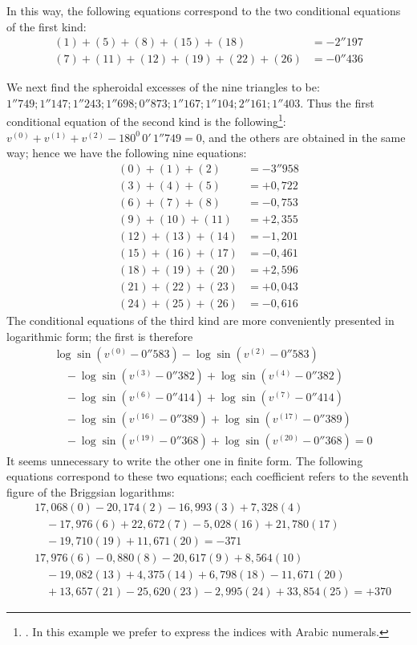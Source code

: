 In this way, the following equations correspond to the two conditional equations of the first kind:
\[
\begin{aligned}
(1)+(5)+(8)+(15)+(18)&=-2''197\\
(7)+(11)+(12)+(19)+(22)+(26)&=-0''436
\end{aligned}
\]

We next find the spheroidal excesses of the nine triangles to be: \(1''749;\allowbreak1''147;\allowbreak1''243;\allowbreak1''698;\allowbreak0''873;\allowbreak1''167;\allowbreak1''104;\allowbreak2''161;\allowbreak1''403\). Thus the first conditional equation of the second kind is the following\footnote{. In this example we prefer to express the indices with Arabic numerals.}: \(v^{(0)}+v^{(1)}+v^{(2)}-180^0\,0'\,1''749=0\), and the others are obtained in the same way; hence we have the following nine equations:
\[
\begin{aligned}
(0)+(1)+(2)&=-3''958\\
(3)+(4)+(5)&=+0{,}722\\
(6)+(7)+(8)&=-0{,}753\\
(9)+(10)+(11)&=+2{,}355\\
(12)+(13)+(14)&=-1{,}201\\
(15)+(16)+(17)&=-0{,}461\\
(18)+(19)+(20)&=+2{,}596\\
(21)+(22)+(23)&=+0{,}043\\
(24)+(25)+(26)&=-0{,}616
\end{aligned}
\]
The conditional equations of the third kind are more conveniently presented in logarithmic form; the first is therefore
\[
\begin{aligned}
&\log\sin(v^{(0)}-0''583)-\log\sin(v^{(2)}-0''583)\\
&\quad-\log\sin(v^{(3)}-0''382)+\log\sin(v^{(4)}-0''382)\\
&\quad-\log\sin(v^{(6)}-0''414)+\log\sin(v^{(7)}-0''414)\\
&\quad-\log\sin(v^{(16)}-0''389)+\log\sin(v^{(17)}-0''389)\\
&\quad-\log\sin(v^{(19)}-0''368)+\log\sin(v^{(20)}-0''368)=0
\end{aligned}
\]
It seems unnecessary to write the other one in finite form. The following equations correspond to these two equations; each coefficient refers to the seventh figure of the Briggsian logarithms:
\[
\begin{aligned}
&17{,}068(0)-20{,}174(2)-16{,}993(3)+7{,}328(4)\\
&\quad-17{,}976(6)+22{,}672(7)-5{,}028(16)+21{,}780(17)\\
&\quad-19{,}710(19)+11{,}671(20)=-371\\[5pt]
&17{,}976(6)-0{,}880(8)-20{,}617(9)+8{,}564(10)\\
&\quad-19{,}082(13)+4{,}375(14)+6{,}798(18)-11{,}671(20)\\
&\quad+13{,}657(21)-25{,}620(23)-2{,}995(24)+33{,}854(25)=+370
\end{aligned}
\]


